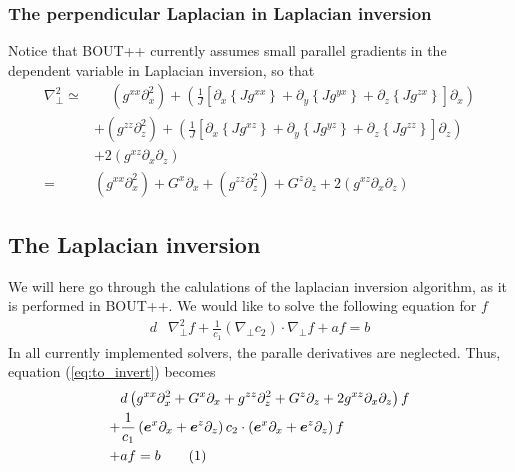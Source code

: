 \documentclass[12pt]{article}
\def\L{\left}
\def\R{\right}
\newcommand{\Grad}{\ensuremath{\nabla}}
\newcommand{\ve}[1]{\ensuremath{\boldsymbol{#1}}}
\newcommand\numberthis{\addtocounter{equation}{1}\tag{\theequation}}
\begin{document}
\subsubsection{The perpendicular Laplacian in Laplacian inversion}
%
Notice that BOUT++ currently assumes small parallel gradients in the dependent
variable in Laplacian inversion, so that
%
\begin{align*}
    \Grad_\perp^2 \simeq& \quad \,
               \L(g^{xx} \partial_x^2\R)
               + \L(
                    \frac{1}{J} \L[
                      \partial_x \L\{J g^{xx} \R\}
                    + \partial_y \L\{J g^{yx} \R\}
                    + \partial_z \L\{J g^{zx} \R\}
                    \R]
                    \partial_x\R)\\
            &+ \L(g^{zz} \partial_z^2\R)
               + \L(
                    \frac{1}{J} \L[
                      \partial_x \L\{J g^{xz} \R\}
                    + \partial_y \L\{J g^{yz} \R\}
                    + \partial_z \L\{J g^{zz} \R\}
                    \R]
                    \partial_z\R)\\
            &+ 2\L(g^{xz} \partial_x \partial_z\R)\\
%
%
           =&
               \L(g^{xx} \partial_x^2\R)
               +
                    G^x\partial_x
            + \L(g^{zz} \partial_z^2\R)
               + G^z \partial_z
            + 2\L(g^{xz} \partial_x \partial_z\R)
\end{align*}
%



\subsection{The Laplacian inversion}
%
We will here go through the calulations of the laplacian inversion algorithm,
as it is performed in BOUT++. We would like to solve the following equation
for $f$
%
\begin{align}
    d&\Grad_\perp^2f + \frac{1}{c_1}(\Grad_\perp c_2)\cdot\Grad_\perp f + af = b
    \label{eq:to_invert}
\end{align}
%
In all currently implemented solvers, the paralle derivatives are neglected.
Thus, equation (\ref{eq:to_invert}) becomes
%
\begin{align*}
    \, &d
    \L(    g^{xx} \partial_x^2
         + G^x \partial_x
         + g^{zz} \partial_z^2
         + G^z \partial_z
         + 2g^{xz} \partial_x \partial_z
    \R)
    f
    \\
%
    +& \frac{1}{c_1}\L(
          \ve{e}^x \partial_x
       +  \ve{e}^z \partial_z
    \R)
    c_2
    \cdot
       \L(
          \ve{e}^x \partial_x
       +  \ve{e}^z \partial_z
       \R)
       f
       \\
%
    +& af = b
    \numberthis
    \label{eq:invert_expanded}
\end{align*}
%
\end{document}
